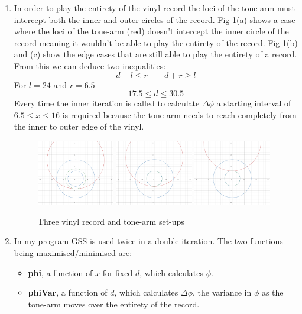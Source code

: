 \documentclass[a4paper]{article}
\begin{document}
\renewcommand{\labelenumi}{\roman{enumi}}
\begin{enumerate}
\item
	In order to play the entirety of the vinyl record the loci of the tone-arm must intercept both the inner and outer circles of the record. Fig \ref{vinyls}(a) shows a case where the loci of the tone-arm (red) doesn't intercept the inner circle of the record meaning it wouldn't be able to play the entirety of the record. Fig \ref{vinyls}(b) and (c) show the edge cases that are still able to play the entirety of a record. From this we can deduce two inequalities:
    \[ d-l \leq r \qquad d+r \geq l \]
    For $l=24$ and $r=6.5$
    \[ 17.5 \leq d \leq 30.5 \]
	Every time the inner iteration is called to calculate $\Delta\phi$ a starting interval of $6.5 \leq x \leq 16$ is required because the tone-arm needs to reach completely from the inner to outer edge of the vinyl.
    \begin{figure}[H]
    \centering
    \includegraphics[width=0.32\textwidth]{Q6_diagram_1.PNG}
    \includegraphics[width=0.32\textwidth]{Q6_diagram_2.PNG}
    \includegraphics[width=0.32\textwidth]{Q6_diagram_3.PNG}
    \caption{Three vinyl record and tone-arm set-ups}
    \label{vinyls}
    \end{figure}
    
\item
    In my program GSS is used twice in a double iteration. The two functions being maximised/minimised are:
    \begin{itemize}
    \item \textbf{phi}, a function of $x$ for fixed $d$, which calculates $\phi$.
    \item \textbf{phiVar}, a function of $d$, which calculates $\Delta\phi$, the variance in $\phi$ as the tone-arm moves over the entirety of the record.
    \end{itemize}
    

\end{enumerate}
\end{document}
